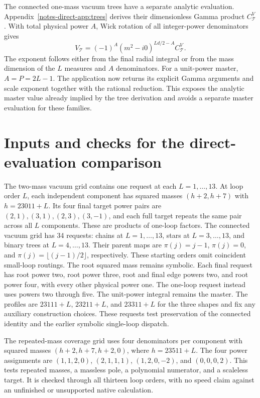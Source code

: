 \documentclass[11pt,a4paper]{article}
\begin{document}
The connected one-mass vacuum trees have a separate analytic evaluation. Appendix~\ref{notes-direct-app:trees} derives their dimensionless Gamma product $C^V_{\mathcal T}$. With total physical power $A$, Wick rotation of all integer-power denominators gives
\begin{equation}
 V_{\mathcal T}=(-1)^A(m^2-i0)^{Ld/2-A}C^V_{\mathcal T}.
 \label{notes-direct-eq:direct-tree-value}
\end{equation}
The exponent follows either from the final radial integral or from the mass dimension of the $L$ measures and $A$ denominators. For a unit-power master, $A=P=2L-1$. The application now returns its explicit Gamma arguments and scale exponent together with the rational reduction. This exposes the analytic master value already implied by the tree derivation and avoids a separate master evaluation for these families.

\section{Inputs and checks for the direct-evaluation comparison}
\label{notes-direct-app:direct-inputs}
The two-mass vacuum grid contains one request at each $L=1,\ldots,13$. At loop order $L$, each independent component has squared masses $(h+2,h+7)$ with $h=23011+L$. Its four final target power pairs are $(2,1),(3,1),(2,3),(3,-1)$, and each full target repeats the same pair across all $L$ components. These are products of one-loop factors. The connected vacuum grid has 34 requests: chains at $L=1,\ldots,13$, stars at $L=3,\ldots,13$, and binary trees at $L=4,\ldots,13$. Their parent maps are $\pi(j)=j-1$, $\pi(j)=0$, and $\pi(j)=\lfloor(j-1)/2\rfloor$, respectively. These starting orders omit coincident small-loop routings. The root squared mass remains symbolic. Each final request has root power two, root power three, root and final edge powers two, and root power four, with every other physical power one. The one-loop request instead uses powers two through five. The unit-power integral remains the master. The profiles are $23111+L$, $23211+L$, and $23311+L$ for the three shapes and fix any auxiliary construction choices. These requests test preservation of the connected identity and the earlier symbolic single-loop dispatch.

The repeated-mass coverage grid uses four denominators per component with squared masses $(h+2,h+7,h+2,0)$, where $h=23511+L$. The four power assignments are $(1,1,2,0)$, $(2,1,1,1)$, $(1,2,0,-2)$, and $(0,0,0,2)$. This tests repeated masses, a massless pole, a polynomial numerator, and a scaleless target. It is checked through all thirteen loop orders, with no speed claim against an unfinished or unsupported native calculation.
\end{document}
